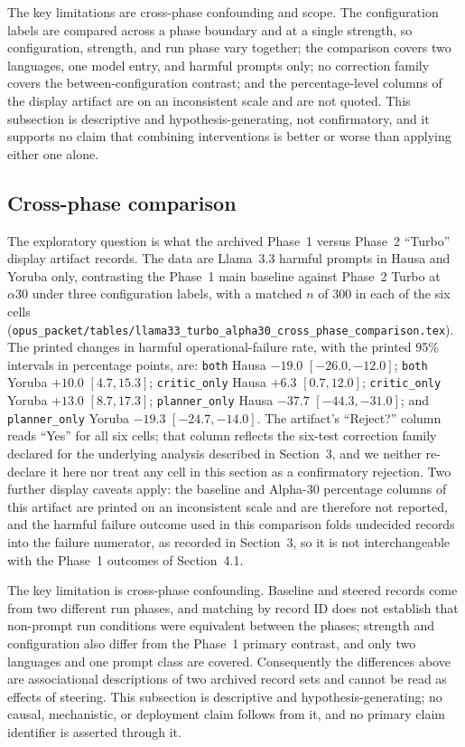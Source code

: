The key limitations are cross-phase confounding and scope. The configuration
labels are compared across a phase boundary and at a single strength, so
configuration, strength, and run phase vary together; the comparison covers two
languages, one model entry, and harmful prompts only; no correction family
covers the between-configuration contrast; and the percentage-level columns of
the display artifact are on an inconsistent scale and are not quoted. This
subsection is descriptive and hypothesis-generating, not confirmatory, and it
supports no claim that combining interventions is better or worse than applying
either one alone.

\subsection{Cross-phase comparison}

The exploratory question is what the archived Phase~1 versus Phase~2 ``Turbo''
display artifact records. The data are Llama~3.3 harmful prompts in Hausa and
Yoruba only, contrasting the Phase~1 main baseline against Phase~2 Turbo at
$\alpha30$ under three configuration labels, with a matched $n$ of 300 in each
of the six cells
(\texttt{opus\_packet/tables/llama33\_turbo\_alpha30\_cross\_phase\_comparison.tex}).
The printed changes in harmful operational-failure rate, with the printed 95\%
intervals in percentage points, are: \texttt{both} Hausa $-19.0$
$[-26.0, -12.0]$; \texttt{both} Yoruba $+10.0$ $[4.7, 15.3]$;
\texttt{critic\_only} Hausa $+6.3$ $[0.7, 12.0]$; \texttt{critic\_only} Yoruba
$+13.0$ $[8.7, 17.3]$; \texttt{planner\_only} Hausa $-37.7$ $[-44.3, -31.0]$;
and \texttt{planner\_only} Yoruba $-19.3$ $[-24.7, -14.0]$. The artifact's
``Reject?'' column reads ``Yes'' for all six cells; that column reflects the
six-test correction family declared for the underlying analysis described in
Section~3, and we neither re-declare it here nor treat any cell in this section
as a confirmatory rejection. Two further display caveats apply: the baseline and
Alpha-30 percentage columns of this artifact are printed on an inconsistent
scale and are therefore not reported, and the harmful failure outcome used in
this comparison folds undecided records into the failure numerator, as recorded
in Section~3, so it is not interchangeable with the Phase~1 outcomes of
Section~4.1.

The key limitation is cross-phase confounding. Baseline and steered records come
from two different run phases, and matching by record ID does not establish that
non-prompt run conditions were equivalent between the phases; strength and
configuration also differ from the Phase~1 primary contrast, and only two
languages and one prompt class are covered. Consequently the differences above
are associational descriptions of two archived record sets and cannot be read as
effects of steering. This subsection is descriptive and hypothesis-generating;
no causal, mechanistic, or deployment claim follows from it, and no primary
claim identifier is asserted through it.

